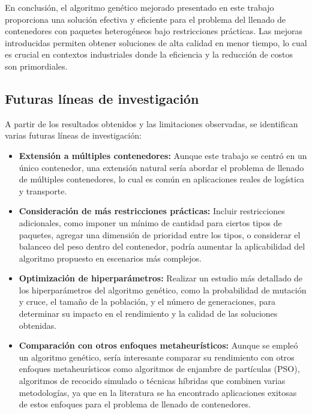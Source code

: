 \documentclass[openany]{article}
\begin{document}
En conclusión, el algoritmo genético mejorado presentado en este trabajo proporciona una solución efectiva y eficiente para el problema del llenado de contenedores con paquetes heterogéneos bajo restricciones prácticas. Las mejoras introducidas permiten obtener soluciones de alta calidad en menor tiempo, lo cual es crucial en contextos industriales donde la eficiencia y la reducción de costos son primordiales.

\subsection{Futuras líneas de investigación}

A partir de los resultados obtenidos y las limitaciones observadas, se identifican varias futuras líneas de investigación:

\begin{itemize}
    \item \textbf{Extensión a múltiples contenedores:} Aunque este trabajo se centró en un único contenedor, una extensión natural sería abordar el problema de llenado de múltiples contenedores, lo cual es común en aplicaciones reales de logística y transporte.

    \item \textbf{Consideración de más restricciones prácticas:} Incluir restricciones adicionales, como imponer un mínimo de cantidad para ciertos tipos de paquetes, agregar una dimensión de prioridad entre los tipos, o considerar el balanceo del peso dentro del contenedor, podría aumentar la aplicabilidad del algoritmo propuesto en escenarios más complejos.

    \item \textbf{Optimización de hiperparámetros:} Realizar un estudio más detallado de los hiperparámetros del algoritmo genético, como la probabilidad de mutación y cruce, el tamaño de la población, y el número de generaciones, para determinar su impacto en el rendimiento y la calidad de las soluciones obtenidas.

    \item \textbf{Comparación con otros enfoques metaheurísticos:} Aunque se empleó un algoritmo genético, sería interesante comparar su rendimiento con otros enfoques metaheurísticos como algoritmos de enjambre de partículas (PSO), algoritmos de recocido simulado o técnicas híbridas que combinen varias metodologías, ya que en la literatura se ha encontrado aplicaciones exitosas de estos enfoques para el problema de llenado de contenedores.


\end{itemize}
\end{document}
